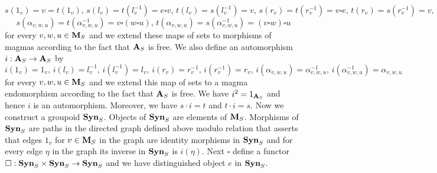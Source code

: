 $$s(1_v) = v = t(1_v),\,s(l_v) = t(l_v^{-1}) = e\square v,\,t(l_v) = s(l^{-1}_v) = v,\,s(r_v)= t(r^{-1}_v) = v\square e,\,t(r_v)= s(r^{-1}_v) = v,$$
$$s(\alpha_{v,w,u})= t(\alpha^{-1}_{v,w,u})=v\square(w\square u),\,t(\alpha_{v,w,u})= s(\alpha^{-1}_{v,w,u})=(v\square w)\square u$$
for every $v,w,u\in \mathbf{M}_S$ and we extend these maps of sets to morphisms of magmas according to the fact that $\mathbf{A}_S$ is free. We also define an automorphism $i:\mathbf{A}_S\rightarrow \mathbf{A}_S$ by
$$i(1_v)= 1_v,\,i(l_v)=l^{-1}_v,\,i(l^{-1}_v)=l_v,\,i(r_v)=r^{-1}_v,\,i(r^{-1}_v)=r_v,\,i(\alpha_{v,w,u})=\alpha^{-1}_{v,w,u},\,i(\alpha^{-1}_{v,w,u})=\alpha_{v,w,u}$$
for every $v,w,u\in \mathbf{M}_S$ and we extend this map of sets to a magma endomorphism according to the fact that $\mathbf{A}_S$ is free. We have $i^2 = 1_{\mathbf{A}_S}$ and hence $i$ is an automorphism. Moreover, we have $s\cdot i = t$ and $t\cdot i= s$. Now we construct a groupoid $\mathbf{Syn}_S$. Objects of $\mathbf{Syn}_S$ are elements of $\mathbf{M}_S$. Morphisms of $\mathbf{Syn}_S$ are paths in the directed graph defined above modulo relation that asserts that edges $1_v$ for $v\in \mathbf{M}_S$ in the graph are identity morphisms in $\mathbf{Syn}_S$ and for every edge $\eta$ in the graph its inverse in $\mathbf{Syn}_S$ is $i(\eta)$. Next $\square$ define a functor $\square:\mathbf{Syn}_S\times \mathbf{Syn}_S \rightarrow \mathbf{Syn}_S$ and we have distinguished object $e$ in $\mathbf{Syn}_S$.

